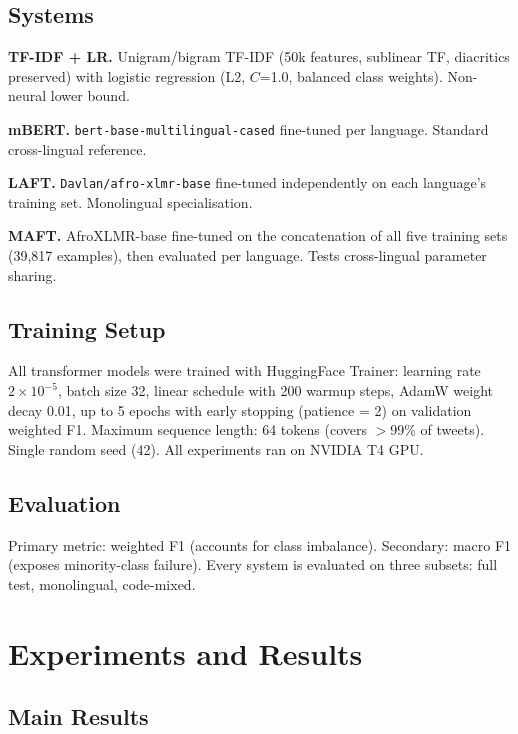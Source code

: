 \documentclass[11pt,twocolumn]{article}
\begin{document}
\subsection{Systems}

\textbf{TF-IDF + LR.} Unigram/bigram TF-IDF (50k features, sublinear TF, diacritics preserved)
with logistic regression (L2, $C$=1.0, balanced class weights). Non-neural lower bound.

\textbf{mBERT.} \texttt{bert-base-multilingual-cased} \cite{devlin-etal-2019-bert} fine-tuned
per language. Standard cross-lingual reference.

\textbf{LAFT.} \texttt{Davlan/afro-xlmr-base} \cite{alabi-etal-2022-adapting} fine-tuned
independently on each language's training set. Monolingual specialisation.

\textbf{MAFT.} AfroXLMR-base fine-tuned on the concatenation of all five training sets
(39,817 examples), then evaluated per language. Tests cross-lingual parameter sharing.

\subsection{Training Setup}

All transformer models were trained with HuggingFace Trainer: learning rate $2\times10^{-5}$,
batch size 32, linear schedule with 200 warmup steps, AdamW weight decay 0.01, up to 5 epochs
with early stopping (patience = 2) on validation weighted F1. Maximum sequence length: 64 tokens
(covers $>$99\% of tweets). Single random seed (42). All experiments ran on NVIDIA T4 GPU.

\subsection{Evaluation}

Primary metric: weighted F1 (accounts for class imbalance). Secondary: macro F1 (exposes
minority-class failure). Every system is evaluated on three subsets: full test, monolingual,
code-mixed.

\section{Experiments and Results}

\subsection{Main Results}
\end{document}
